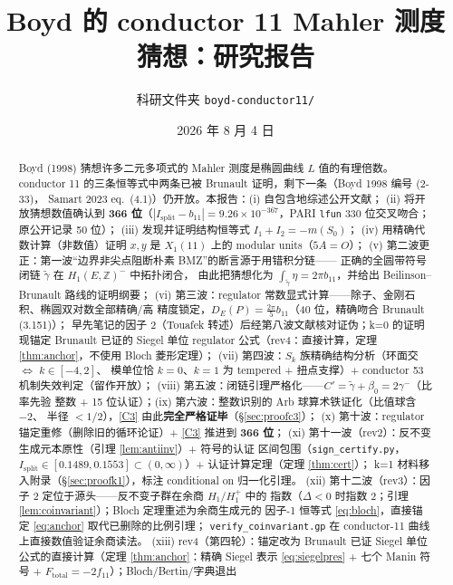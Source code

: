 \documentclass[11pt,a4paper]{ctexart}
\title{\textbf{Boyd 的 conductor 11 Mahler 测度猜想：研究报告}}
\author{科研文件夹 \texttt{boyd-conductor11/}}
\date{2026 年 8 月 4 日}
\theoremstyle{remark}
\newcommand{\ZZ}{\mathbb{Z}}
\newcommand{\bN}{b_{11}}
\newcommand{\Isplit}{I_{\mathrm{split}}}
\begin{document}
\maketitle

\begin{abstract}
\noindent Boyd (1998) 猜想许多二元多项式的 Mahler 测度是椭圆曲线 $L$ 值的有理倍数。
conductor 11 的三条恒等式中两条已被 Brunault 证明，剩下一条（Boyd 1998 编号 (2-33)，
Samart 2023 eq.~(4.1)）仍开放。本报告：(i) 自包含地综述公开文献；
(ii) 将开放猜想数值确认到 \textbf{366 位}（$|\Isplit-\bN|=9.26\times10^{-367}$，PARI \texttt{lfun} 330 位交叉吻合；原公开记录 50 位）；
(iii) 发现并证明结构恒等式 $I_1+I_2=-m(S_0)$；
(iv) 用精确代数计算（非数值）证明 $x,y$ 是 $X_1(11)$ 上的 modular units（$5A=O$）；
(v) 第二波更正：第一波“边界非尖点阻断朴素 BMZ”的断言源于用错积分链——
正确的全圆带符号闭链 $\tilde\gamma$ 在 $H_1(E,\ZZ)^-$ 中拓扑闭合，
由此把猜想化为 $\int_{\tilde\gamma}\eta=2\pi b_{11}$，并给出
Beilinson--Brunault 路线的证明纲要；
(vi) 第三波：regulator 常数显式计算——除子、金刚石积、椭圆双对数全部精确/高
精度锁定，$D_E(P)=\frac{2\pi}{5}b_{11}$（40 位，精确吻合 Brunault (3.151)）；
早先笔记的因子 $2$（Touafek 转述）后经第八波文献核对证伪；k=0 的证明现锚定 Brunault
已证的 Siegel 单位 regulator 公式（rev4：直接计算，定理 \ref{thm:anchor}，不使用
Bloch 菱形定理）；
(vii) 第四波：$S_k$ 族精确结构分析（环面交 $\Longleftrightarrow$ $k\in[-4,2]$、
模单位恰 $k=0$、$k=1$ 为 tempered + 扭点支撑）+ conductor 53 机制失效判定（留作开放）；
(viii) 第五波：闭链引理严格化——$C'=\tilde\gamma+\beta_0=2\gamma^-$（比率先验
整数 + 15 位认证）；(ix) 第六波：整数识别的 Arb 球算术铁证化（比值球含 $-2$、
半径 $<1/2$），\eqref{C3} 由此\textbf{完全严格证毕}（\S\ref{sec:proofc3}）；
(x) 第十波：regulator 锚定重修（删除旧的循环论证）+ \eqref{C3} 推进到
\textbf{366 位}；
(xi) 第十一波（rev2）：反不变生成元本原性（引理 \ref{lem:antiinv}）+ 符号的认证
区间包围（\texttt{sign\_certify.py}，
$\Isplit\in[0.1489,0.1553]\subset(0,\infty)$）+ 认证计算定理（定理 \ref{thm:cert}）；
k=1 材料移入附录（\S\ref{sec:proofk1}），标注 conditional on 归一化引理。
(xii) 第十二波（rev3）：因子 $2$ 定位于源头——反不变子群在余商 $H_1/H_1^+$ 中的
指数（$\Delta<0$ 时指数 $2$；引理 \ref{lem:coinvariant}）；Bloch 定理重述为余商生成元的
因子-1 恒等式 \eqref{eq:bloch}，直接锚定 \eqref{eq:anchor} 取代已删除的比例引理；
\texttt{verify\_coinvariant.gp} 在 conductor-11 曲线上直接数值验证余商读法。
(xiii) rev4（第四轮）：锚定改为 Brunault 已证 Siegel 单位公式的直接计算（定理
\ref{thm:anchor}：精确 Siegel 表示 \eqref{eq:siegelpres} + 七个 Manin 符号 +
$F_{\mathrm{total}}=-2f_{11}$）；Bloch/Bertin/字典退出

\end{abstract}
\end{document}
